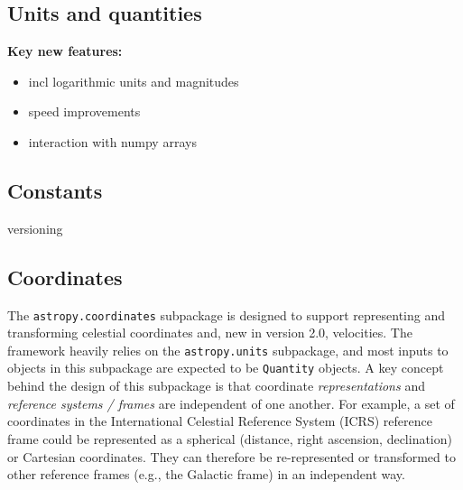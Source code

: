 \documentclass[modern]{aastex61}
\begin{document}

\subsection{Units and quantities}
\label{sec:units}

\textbf{Key new features:}
\begin{itemize}
	\item incl logarithmic units and magnitudes
	\item speed improvements
    \item interaction with numpy arrays
\end{itemize}

\subsection{Constants}
versioning


\subsection{Coordinates}
\label{sec:coordinates}

The \texttt{astropy.coordinates} subpackage is designed to support representing
and transforming celestial coordinates and, new in version 2.0, velocities.
The framework heavily relies on the \texttt{astropy.units} subpackage, and most
inputs to objects in this subpackage are expected to be \texttt{Quantity}
objects.
A key concept behind the design of this subpackage is that coordinate
\textit{representations} and \textit{reference systems / frames} are independent
of one another.
For example, a set of coordinates in the International Celestial Reference
System (ICRS) reference frame could be represented as a spherical (distance,
right ascension, declination) or Cartesian coordinates.
They can therefore be re-represented or transformed to other reference frames
(e.g., the Galactic frame) in an independent way.
\end{document}
